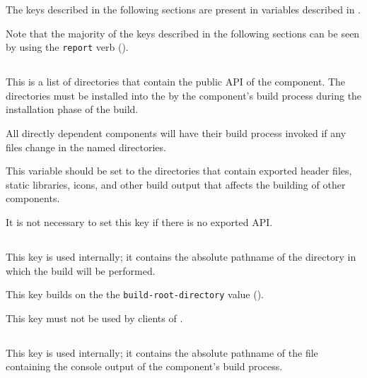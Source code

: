 The keys described in the following sections are present in variables
described in .

Note that the majority of the keys described in the following sections
can be seen by using the \texttt{report} verb
().


\subsection{}\label{variables:api}

This is a list of directories that contain the public API of the
component.  The directories must be installed into the \destdir by the
component's build process during the installation phase of the build.

All directly dependent components will have their build process
invoked if any files change in the named directories.

This variable should be set to the directories that contain exported
header files, static libraries, icons, and other build output that
affects the building of other components.

It is not necessary to set this key if there is no exported API.


\subsection{}\label{variables:build-directory}

This key is used internally; it contains the absolute pathname of the
directory in which the build will be performed.

This key builds on the the \texttt{build-root-directory} value
().

This key must not be used by clients of \lmsbw.


\subsection{}\label{variables:build-log}

This key is used internally; it contains the absolute pathname of the
file containing the console output of the component's build process.

